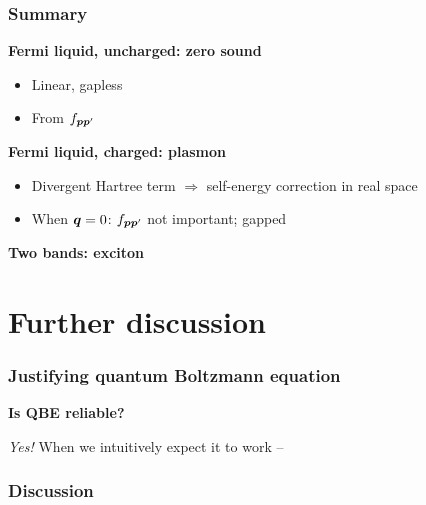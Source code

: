 \documentclass{beamer}
\begin{document}
\begin{frame}
\frametitle{Summary}

\textbf{Fermi liquid, uncharged: zero sound} 
\begin{itemize}
    \item Linear, gapless 
    \item From $f_{\vb*{p} \vb*{p}'}$ 
\end{itemize}

\vspace{0.5cm}

\textbf{Fermi liquid, charged: plasmon} \begin{itemize}
    \item Divergent Hartree term $\Rightarrow$ self-energy correction in real space 
    \item When $\vb*{q} = 0$: $f_{\vb*{p} \vb*{p}'}$ not important; gapped
\end{itemize}

\vspace{0.5cm}

\textbf{Two bands: exciton} 

\end{frame}

\section{Further discussion}

\begin{frame}
\frametitle{Justifying quantum Boltzmann equation}

\textbf{Is QBE reliable?}

\emph{Yes!} When we intuitively expect it to work --

\begin{center}
    
\end{center}

\end{frame}

\begin{frame}
\frametitle{Discussion}



\end{frame}
\end{document}
